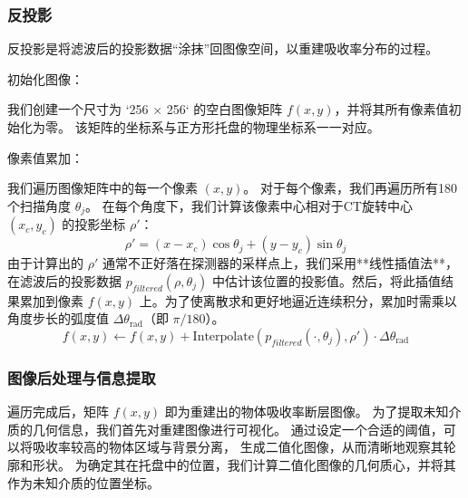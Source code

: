 \subsubsection{反投影}
反投影是将滤波后的投影数据“涂抹”回图像空间，以重建吸收率分布的过程。\par
初始化图像：\par
我们创建一个尺寸为 `256 × 256` 的空白图像矩阵 $f(x, y)$，并将其所有像素值初始化为零。
该矩阵的坐标系与正方形托盘的物理坐标系一一对应。\par
像素值累加：\par
我们遍历图像矩阵中的每一个像素 $(x, y)$。
对于每个像素，我们再遍历所有180个扫描角度 $\theta_j$。
在每个角度下，我们计算该像素中心相对于CT旋转中心 $(x_c, y_c)$ 的投影坐标 $\rho'$：
$$
    \rho' = (x - x_c)\cos\theta_j + (y - y_c)\sin\theta_j
$$
由于计算出的 $\rho'$ 通常不正好落在探测器的采样点上，我们采用**线性插值法**，在滤波后的投影数据 $p_{filtered}(\rho, \theta_j)$ 中估计该位置的投影值。然后，将此插值结果累加到像素 $f(x, y)$ 上。为了使离散求和更好地逼近连续积分，累加时需乘以角度步长的弧度值 $\Delta\theta_{\text{rad}}$（即 $\pi/180$）。
$$
    f(x,y) \leftarrow f(x,y) + \text{Interpolate}(p_{filtered}(\cdot, \theta_j), \rho') \cdot \Delta\theta_{\text{rad}}
$$

\subsubsection{图像后处理与信息提取}
遍历完成后，矩阵 $f(x, y)$ 即为重建出的物体吸收率断层图像。
为了提取未知介质的几何信息，我们首先对重建图像进行可视化。
通过设定一个合适的阈值，可以将吸收率较高的物体区域与背景分离，
生成二值化图像，从而清晰地观察其轮廓和形状。
为确定其在托盘中的位置，我们计算二值化图像的几何质心，并将其作为未知介质的位置坐标。